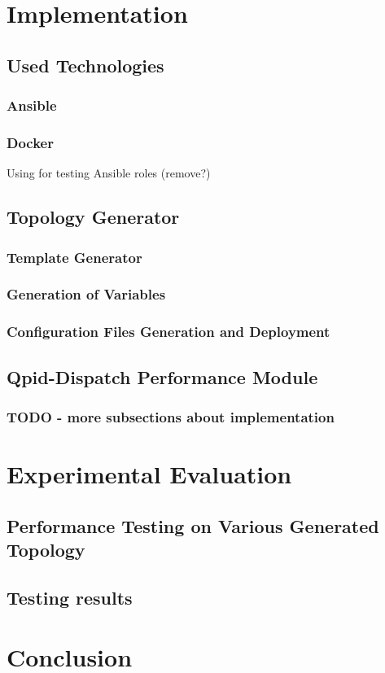 \chapter{Implementation}
\label{Implementation}

\section{Used Technologies}

\subsection{Ansible}

\subsection{Docker}
Using for testing Ansible roles (remove?)

\section{Topology Generator}

\subsection{Template Generator}

\subsection{Generation of Variables}

\subsection{Configuration Files Generation and Deployment}

\section{Qpid-Dispatch Performance Module}

\subsection{TODO - more subsections about implementation}

\chapter{Experimental Evaluation}
\label{Experimental Evaluation}

\section{Performance Testing on Various Generated Topology}

\section{Testing results}

\chapter{Conclusion}
\label{Conclusion}

